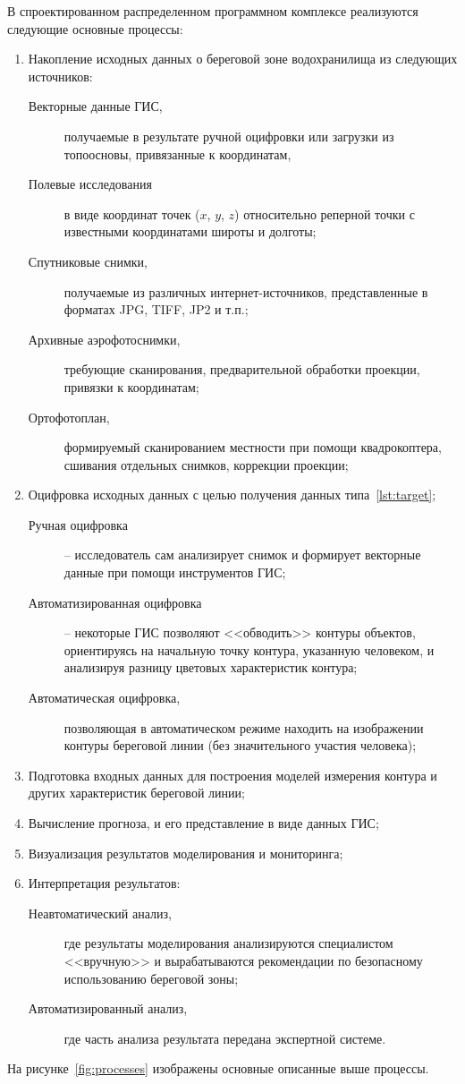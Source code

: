 \documentclass[732,fontsize=14pt,final]{studrep}
\begin{document}
В спроектированном распределенном программном комплексе реализуются следующие основные процессы:
\begin{enumerate}
  \item Накопление исходных данных о береговой зоне водохранилища из следующих источников:
  \begin{description}
    \item [Векторные данные ГИС,] получаемые в результате ручной оцифровки или загрузки из топоосновы, привязанные к координатам, \label{lst:target}
    \item [Полевые исследования] в виде координат точек ($x$, $y$, $z$) относительно реперной точки с известными координатами широты и долготы;
    \item [Спутниковые снимки,] получаемые из различных интернет-источников, представленные в форматах JPG, TIFF, JP2 и т.п.;
    \item [Архивные аэрофотоснимки,] требующие сканирования, предварительной обработки проекции, привязки к координатам;
    \item [Ортофотоплан,] формируемый сканированием местности при помощи квадрокоптера, сшивания отдельных снимков, коррекции проекции;
  \end{description}
  \item Оцифровка исходных данных с целью получения данных типа~\ref{lst:target};
  \begin{description}
    \item[Ручная оцифровка] -- исследователь сам анализирует снимок и формирует векторные данные при помощи инструментов ГИС;
    \item[Автоматизированная оцифровка] -- некоторые ГИС позволяют <<обводить>> контуры объектов, ориентируясь на начальную точку контура, указанную человеком, и анализируя разницу цветовых характеристик контура;
    \item[Автоматическая оцифровка,] позволяющая в автоматическом режиме находить на изображении контуры береговой линии (без значительного участия человека);
  \end{description}
  \item Подготовка входных данных для построения моделей измерения контура и других характеристик береговой линии;
  \item Вычисление прогноза, и его представление в виде данных ГИС;
  \item Визуализация результатов моделирования и мониторинга;
  \item Интерпретация результатов:
  \begin{description}
    \item[Неавтоматический анализ,] где результаты моделирования анализируются специалистом <<вручную>> и вырабатываются рекомендации по безопасному использованию береговой зоны;
    \item[Автоматизированный анализ,] где часть анализа результата передана экспертной системе.
  \end{description}
\end{enumerate}
На рисунке~\ref{fig:processes} изображены основные описанные выше процессы.
\end{document}
